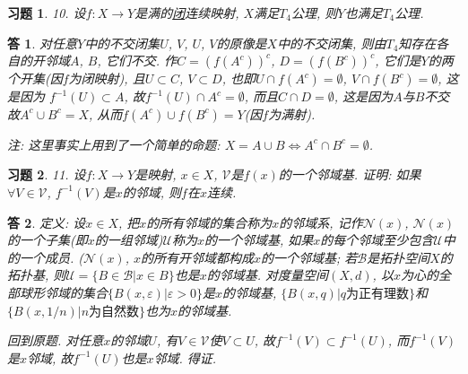 \documentclass{ctexart}%
\newtheorem*{exercise}{习题}
\newtheorem*{solution}{答}
\theoremstyle{definition}
\theoremstyle{remark}
\begin{document}
\begin{exercise}10. 设$f:X\rightarrow Y$是满的\underline{闭}连续映射, $X$满足$T_4$公理, 则$Y$也满足$T_4$公理.
\end{exercise}
\begin{solution}
对任意$Y$中的不交闭集$U$, $V$, $U$, $V$的原像是$X$中的不交闭集, 则由$T_4$知存在各自的开邻域$A$, $B$, 它们不交. 作$C=(f(A^c))^c$, $D=(f(B^c))^c$, 它们是$Y$的两个开集(因$f$为闭映射), 且$U\subset C$, $V\subset D$, 也即$U\cap f(A^c)=\emptyset$, $V\cap f(B^c)=\emptyset$, 这是因为 $f^{-1}(U)\subset A$, 故$f^{-1}(U)\cap A^c=\emptyset$, 而且$C\cap D=\emptyset$, 这是因为$A$与$B$不交故$A^c\cup B^c= X$, 从而$f(A^c)\cup f(B^c)=Y$(因$f$为满射). 

注: 这里事实上用到了一个简单的命题: $X=A\cup B\Longleftrightarrow A^c\cap B^c=\emptyset$.
\end{solution}

\begin{exercise}11. 设$f: X\rightarrow Y$是映射, $x\in X$, $\mathscr{V}$是$f(x)$的一个邻域基. 证明: 如果$\forall V\in \mathscr{V}$, $f^{-1}(V)$是$x$的邻域, 则$f$在$x$连续. 
\end{exercise}
\begin{solution}
定义: 设$x\in X$, 把$x$的所有邻域的集合称为$x$的邻域系, 记作$\mathscr{N}(x)$, $\mathscr{N}(x)$的一个子集(即$x$的一组邻域)$\mathscr{U}$称为$x$的一个邻域基, 如果$x$的每个邻域至少包含$\mathscr{U}$中的一个成员.  ($\mathscr{N}(x)$, $x$的所有开邻域都构成$x$的一个邻域基; 若$\mathscr{B}$是拓扑空间$X$的拓扑基, 则$\mathscr{U}=\{B\in \mathscr{B}|x\in B\}$也是$x$的邻域基. 对度量空间$(X,d)$, 以$x$为心的全部球形邻域的集合$\{B(x,\varepsilon)|\varepsilon>0\}$是$x$的邻域基, $\{B(x,q)|q\text{为正有理数}\}$和$\{B(x,1/n)|n\text{为自然数}\}$也为$x$的邻域基. 

回到原题. 对任意$x$的邻域$U$, 有$V\in \mathscr{V}$使$V\subset U$, 故$f^{-1}(V)\subset f^{-1}(U)$, 而$f^{-1}(V)$是$x$邻域, 故$f^{-1}(U)$也是$x$邻域. 得证.
\end{solution}
\end{document}
